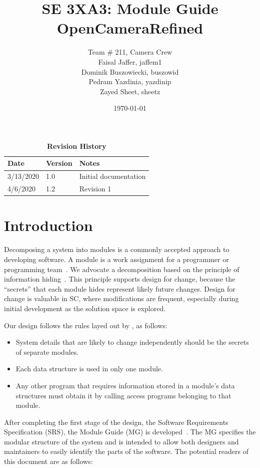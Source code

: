 \documentclass[12pt, titlepage]{article}
\title{SE 3XA3: Module Guide\\OpenCameraRefined}
\author{Team \# 211, Camera Crew
		\\ Faisal Jaffer, jaffem1
		\\ Dominik Buszowiecki, buszowid
		\\ Pedram Yazdinia, yazdinip
		\\ Zayed Sheet, sheetz
}
\date{\today}
\begin{document}
\maketitle

\tableofcontents
\listoftables
\listoffigures

\newpage

\begin{table}[h]
\caption{\bf Revision History}
\begin{tabularx}{\textwidth}{p{3cm}p{2cm}X}
\toprule {\bf Date} & {\bf Version} & {\bf Notes}\\
\midrule
3/13/2020 & 1.0 & Initial documentation\\
4/6/2020 & 1.2 & Revision 1\\
\bottomrule
\end{tabularx}
\end{table}

\newpage



\section{Introduction}

Decomposing a system into modules is a commonly accepted approach to developing
software.  A module is a work assignment for a programmer or programming
team~\citep{ParnasEtAl1984}.  We advocate a decomposition
based on the principle of information hiding~\citep{Parnas1972a}.  This
principle supports design for change, because the ``secrets'' that each module
hides represent likely future changes.  Design for change is valuable in SC,
where modifications are frequent, especially during initial development as the
solution space is explored.  

Our design follows the rules layed out by \citet{ParnasEtAl1984}, as follows:
\begin{itemize}
\item System details that are likely to change independently should be the
  secrets of separate modules.
\item Each data structure is used in only one module.
\item Any other program that requires information stored in a module's data
  structures must obtain it by calling access programs belonging to that module.
\end{itemize}

After completing the first stage of the design, the Software Requirements
Specification (SRS), the Module Guide (MG) is developed~\citep{ParnasEtAl1984}. The MG
specifies the modular structure of the system and is intended to allow both
designers and maintainers to easily identify the parts of the software.  The
potential readers of this document are as follows:
\end{document}
